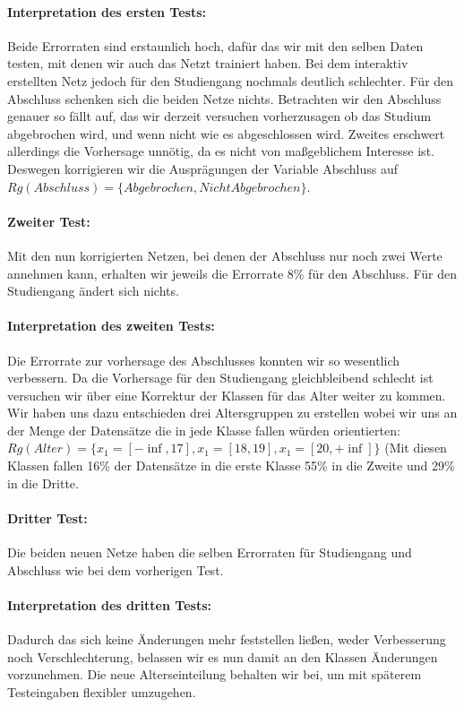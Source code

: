 \paragraph{Interpretation des ersten Tests: } Beide Errorraten sind erstaunlich hoch, dafür das wir mit den selben Daten testen, mit denen wir auch das Netzt trainiert haben. Bei dem interaktiv erstellten Netz jedoch für den Studiengang nochmals deutlich schlechter. Für den Abschluss schenken sich die beiden Netze nichts. Betrachten wir den Abschluss genauer so fällt auf, das wir derzeit versuchen vorherzusagen ob das Studium abgebrochen wird, und wenn nicht wie es abgeschlossen wird. Zweites erschwert allerdings die Vorhersage unnötig, da es nicht von maßgeblichem Interesse ist. Deswegen korrigieren wir die Ausprägungen der Variable Abschluss auf $Rg(Abschluss) = \{Abgebrochen, Nicht Abgebrochen\}$.

\paragraph{Zweiter Test: } Mit den nun korrigierten Netzen, bei denen der Abschluss nur noch zwei Werte annehmen kann, erhalten wir jeweils die Errorrate 8\% für den Abschluss. Für den Studiengang ändert sich nichts.
 
\paragraph{Interpretation des zweiten Tests: }  Die Errorrate zur vorhersage des Abschlusses konnten wir so wesentlich verbessern. Da die Vorhersage für den Studiengang gleichbleibend schlecht ist versuchen wir über eine Korrektur der Klassen für das Alter weiter zu kommen.
Wir haben uns dazu entschieden drei Altersgruppen zu erstellen wobei wir uns an der Menge der Datensätze die in jede Klasse fallen würden orientierten:  $Rg(Alter) = \{x_{1}=[-\inf,17], x_{1}=[18,19] , x_{1}=[20,+\inf] \}$ (Mit diesen Klassen fallen 16\% der Datensätze in die erste Klasse 55\% in die Zweite und 29\% in die Dritte. 

\paragraph{Dritter Test: } Die beiden neuen Netze haben die selben Errorraten für Studiengang und Abschluss wie bei dem vorherigen Test. 

\paragraph{Interpretation des dritten Tests: } Dadurch das sich keine Änderungen mehr feststellen ließen, weder Verbesserung noch Verschlechterung, belassen wir es nun damit an den Klassen Änderungen vorzunehmen. Die neue Alterseinteilung behalten wir bei, um mit späterem Testeingaben flexibler umzugehen. 


